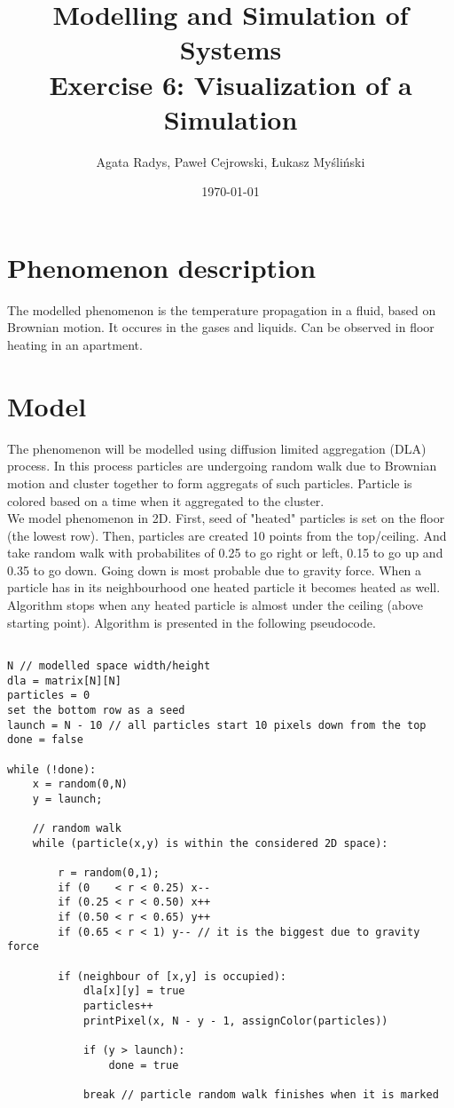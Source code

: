 \documentclass[a4paper,10pt]{article}
\title{Modelling and Simulation of Systems\\ \Large
Exercise 6: Visualization of a Simulation}
\author{Agata Radys, Paweł Cejrowski, Łukasz Myśliński}
\date{\today}
\begin{document}
\maketitle

\section*{Phenomenon description}
The modelled phenomenon is the temperature propagation in a fluid, based on Brownian motion. It occures in the gases and
liquids. Can be observed in floor heating in an apartment.
\section*{Model}
The phenomenon will be modelled using diffusion limited aggregation (DLA) process. In this process particles are undergoing
random walk due to Brownian motion and cluster together to form aggregats of such particles. Particle is colored based on a time
when it aggregated to the cluster.
\\
We model phenomenon in 2D. First, seed of "heated" particles is set on the floor (the lowest row). Then, particles are created
10 points from the top/ceiling. And take random walk with probabilites of 0.25 to go right or left, 0.15 to go up and 0.35 to go down.
Going down is most probable due to gravity force. When a particle has in its neighbourhood one heated particle it becomes heated as well.
Algorithm stops when any heated particle is almost under the ceiling (above starting point). Algorithm is presented in the following pseudocode.

\begin{lstlisting}[]

N // modelled space width/height
dla = matrix[N][N]
particles = 0
set the bottom row as a seed
launch = N - 10 // all particles start 10 pixels down from the top
done = false

while (!done):
    x = random(0,N)
    y = launch;

    // random walk
    while (particle(x,y) is within the considered 2D space):

        r = random(0,1);
        if (0    < r < 0.25) x--
        if (0.25 < r < 0.50) x++
        if (0.50 < r < 0.65) y++
        if (0.65 < r < 1) y-- // it is the biggest due to gravity force

        if (neighbour of [x,y] is occupied):
            dla[x][y] = true
            particles++
            printPixel(x, N - y - 1, assignColor(particles))

            if (y > launch):
                done = true

            break // particle random walk finishes when it is marked
\end{lstlisting}
\end{document}

